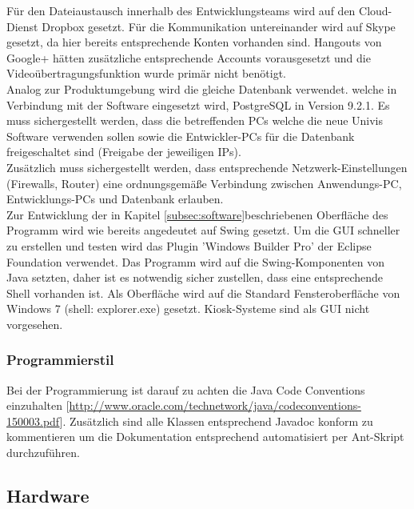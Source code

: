 Für den Dateiaustausch innerhalb des Entwicklungsteams wird auf den Cloud-Dienst Dropbox gesetzt.
Für die Kommunikation untereinander wird auf Skype gesetzt, da hier bereits entsprechende Konten vorhanden sind. Hangouts von Google+ hätten zusätzliche entsprechende Accounts vorausgesetzt und die Videoübertragungsfunktion wurde primär nicht benötigt.\\

Analog zur Produktumgebung wird die gleiche Datenbank verwendet. welche in Verbindung mit der Software eingesetzt wird, PostgreSQL in Version 9.2.1.
Es muss sichergestellt werden, dass die betreffenden PCs welche die neue Univis Software verwenden sollen sowie die Entwickler-PCs für die Datenbank freigeschaltet sind (Freigabe der jeweiligen IPs).\\

Zusätzlich muss sichergestellt werden, dass entsprechende Netzwerk-Einstellungen (Firewalls, Router) eine ordnungsgemäße Verbindung zwischen Anwendungs-PC, Entwicklungs-PCs und Datenbank erlauben.\\

Zur Entwicklung der in Kapitel \ref{subsec:software}beschriebenen Oberfläche des Programm wird wie bereits angedeutet auf Swing gesetzt. Um die GUI schneller zu erstellen und testen wird das Plugin 'Windows Builder Pro' der Eclipse Foundation verwendet.
Das Programm wird auf die Swing-Komponenten von Java setzten, daher ist es notwendig sicher zustellen, dass eine entsprechende Shell vorhanden ist.
Als Oberfläche wird auf die Standard Fensteroberfläche von Windows 7 (shell: explorer.exe) gesetzt. Kiosk-Systeme sind als GUI nicht vorgesehen. \\

\subsubsection{Programmierstil}

Bei der Programmierung ist darauf zu achten die Java Code Conventions einzuhalten [\url{http://www.oracle.com/technetwork/java/codeconventions-150003.pdf}].
Zusätzlich sind alle Klassen entsprechend Javadoc konform zu kommentieren um die Dokumentation entsprechend automatisiert per Ant-Skript durchzuführen.

\subsection{Hardware}
\label{subsec:devhardware}

